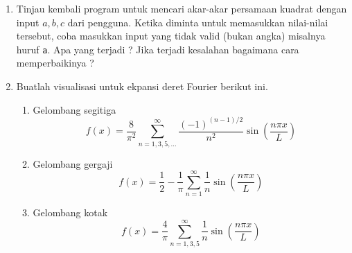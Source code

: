 \documentclass[a4paper,11pt]{extarticle}
\begin{document}
\begin{enumerate}
\item Tinjau kembali program untuk mencari akar-akar persamaan kuadrat dengan input
$a, b, c$ dari pengguna. Ketika diminta untuk memasukkan nilai-nilai tersebut,
coba masukkan input yang tidak valid (bukan angka) misalnya huruf \texttt{a}.
Apa yang terjadi ?
Jika terjadi kesalahan bagaimana cara memperbaikinya ?
%
\item Buatlah visualisasi untuk ekpansi deret Fourier berikut ini.
  \begin{enumerate}
  \item Gelombang segitiga
  \begin{equation}
  f(x) = \frac{8}{\pi^2} \sum_{n=1,3,5,\ldots}^{\infty}
  \frac{(-1)^{(n-1)/2}}{n^2}\sin\left( \frac{n\pi x}{L} \right)
  \end{equation}
  \item Gelombang gergaji
  \begin{equation}
  f(x) = \frac{1}{2} - \frac{1}{\pi}\sum_{n=1}^{\infty}
  \frac{1}{n}\sin\left( \frac{n\pi x}{L} \right)
  \end{equation}
  \item Gelombang kotak
  \begin{equation}
  f(x) = \frac{4}{\pi}\sum_{n=1,3,5}^{\infty}
  \frac{1}{n} \sin\left( \frac{n\pi x}{L} \right)
  \end{equation}
  \end{enumerate}
%
\end{enumerate}
\end{document}
